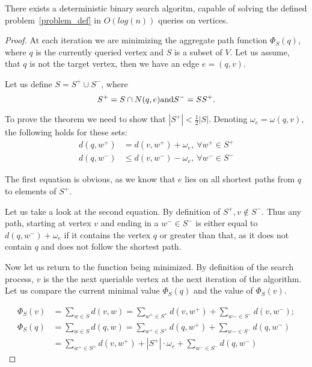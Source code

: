 \begin{theorem}
There exists a deterministic binary search algoritm, capable of solving the defined problem~\ref{problem_def} in $O(log(n))$ queries on vertices.
\end{theorem}
\begin{proof}
	At each iteration we are minimizing the aggregate path function $\Phi_S(q)$, where $q$ is the currently queried vertex and $S$ is a subset of $V$.
	Let us assume, that $q$ is not the target vertex, then we have an edge $e = (q, v)$.


	Let us define $S = S^+ \cup S^-$, where
		\[S^+ = S \cap N(q, e) \text{and} S^- = S \\ S^+.\]


	To prove the theorem we need to show that $|S^+| < \frac{1}{2}|S|$. Denoting $\omega_e = \omega(q, v)$, the following holds for these sets:
	\begin{align*}
	d(q, w^+) &= d(v, w^+) + \omega_e,~\forall w^+ \in S^+
	\\
	d(q, w^-) &\le d(v, w^-) - \omega_e,~\forall w^- \in S^-
	\end{align*}


	The first equation is obvious, as we know that $e$ lies on all shortest paths from $q$ to elements of $S^+$.


	Let us take a look at the second equation. By definition of $S^+, v \notin S^-$. Thus any path, starting at vertex $v$ and ending in a $w^- \in S^-$ is either equal to $d(q, w^-) + \omega_e$ if it contains the vertex $q$ or greater than that, as it does not contain $q$ and does not follow the shortest path.


	Now let us return to the function being minimized. By definition of the search process, $v$ is the the next queriable vertex at the next iteration of the algorithm. Let us compare the current minimal value $\Phi_S(q)$ and the value of $\Phi_S(v)$.


	\begin{align*}
	\Phi_S(v) &= \sum \limits_{w \in S} d(v, w) = \sum \limits_{w^+ \in S^+} d(v, w^+) + \sum \limits_{w- \in S^-} d(v, w^-);
	\\
	\Phi_S(q) &= \sum \limits_{w \in S} d(q, w) = \sum \limits_{w^+ \in S^+} d(q, w^+) + \sum \limits_{w- \in S^-} d(q, w^-) \\
	          &                                 = \sum \limits_{w^+ \in S^+} d(v, w^+) + |S^+| \cdot \omega_e + \sum \limits_{w^- \in S^-} d(q, w^-)
	\end{align*}



\end{proof}
